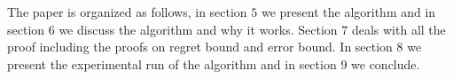 The paper is organized as follows, in section $5$ we present the algorithm and in section $6$ we discuss the algorithm and why it works. Section $7$ deals with all the proof including the proofs on regret bound and error bound. In section $8$ we present the experimental run of the algorithm and in section $9$ we conclude. 
